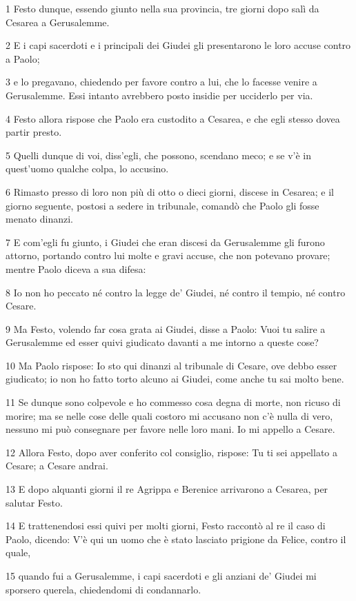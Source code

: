 \par 1 Festo dunque, essendo giunto nella sua provincia, tre giorni dopo salì da Cesarea a Gerusalemme.
\par 2 E i capi sacerdoti e i principali dei Giudei gli presentarono le loro accuse contro a Paolo;
\par 3 e lo pregavano, chiedendo per favore contro a lui, che lo facesse venire a Gerusalemme. Essi intanto avrebbero posto insidie per ucciderlo per via.
\par 4 Festo allora rispose che Paolo era custodito a Cesarea, e che egli stesso dovea partir presto.
\par 5 Quelli dunque di voi, diss'egli, che possono, scendano meco; e se v'è in quest'uomo qualche colpa, lo accusino.
\par 6 Rimasto presso di loro non più di otto o dieci giorni, discese in Cesarea; e il giorno seguente, postosi a sedere in tribunale, comandò che Paolo gli fosse menato dinanzi.
\par 7 E com'egli fu giunto, i Giudei che eran discesi da Gerusalemme gli furono attorno, portando contro lui molte e gravi accuse, che non potevano provare; mentre Paolo diceva a sua difesa:
\par 8 Io non ho peccato né contro la legge de' Giudei, né contro il tempio, né contro Cesare.
\par 9 Ma Festo, volendo far cosa grata ai Giudei, disse a Paolo: Vuoi tu salire a Gerusalemme ed esser quivi giudicato davanti a me intorno a queste cose?
\par 10 Ma Paolo rispose: Io sto qui dinanzi al tribunale di Cesare, ove debbo esser giudicato; io non ho fatto torto alcuno ai Giudei, come anche tu sai molto bene.
\par 11 Se dunque sono colpevole e ho commesso cosa degna di morte, non ricuso di morire; ma se nelle cose delle quali costoro mi accusano non c'è nulla di vero, nessuno mi può consegnare per favore nelle loro mani. Io mi appello a Cesare.
\par 12 Allora Festo, dopo aver conferito col consiglio, rispose: Tu ti sei appellato a Cesare; a Cesare andrai.
\par 13 E dopo alquanti giorni il re Agrippa e Berenice arrivarono a Cesarea, per salutar Festo.
\par 14 E trattenendosi essi quivi per molti giorni, Festo raccontò al re il caso di Paolo, dicendo: V'è qui un uomo che è stato lasciato prigione da Felice, contro il quale,
\par 15 quando fui a Gerusalemme, i capi sacerdoti e gli anziani de' Giudei mi sporsero querela, chiedendomi di condannarlo.
